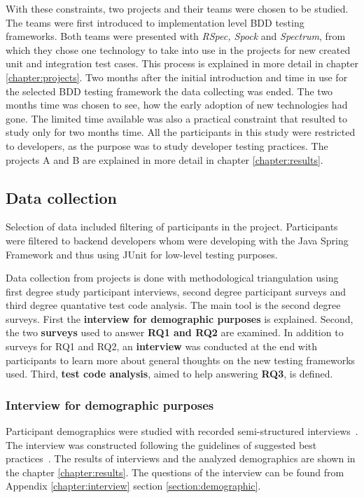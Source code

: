     With these constraints, two projects and their teams were chosen to be studied. The teams were first introduced to
    implementation level BDD testing frameworks. Both teams were presented with \textit{RSpec, Spock} and \textit{Spectrum}, from
    which they chose one technology to take into use in the projects for new created unit and integration test cases. This
    process is explained in more detail in chapter \ref{chapter:projects}. Two months after the initial introduction and time in use for
    the selected BDD testing framework the data collecting was ended. The two months time was chosen to see, how the early
    adoption of new technologies had gone.
    The limited time available was also a practical constraint that resulted to study only for two months time. All the participants
    in this study were restricted to developers, as the purpose was to study developer testing practices. The projects
    A and B are explained in more detail in chapter \ref{chapter:results}.

\subsection{Data collection}
    Selection of data included filtering of participants in the project. Participants were filtered to backend developers
    whom were developing with the Java Spring Framework and thus using JUnit for low-level testing purposes.

    Data collection from projects is done with methodological triangulation using first degree study participant interviews, second degree
    participant surveys and third degree quantative test code analysis. The main tool is the second degree surveys.
    First the \textbf{interview for demographic purposes} is explained. Second, the two \textbf{surveys} used to answer
    \textbf{RQ1 and RQ2} are examined. In addition to surveys for RQ1 and RQ2, an \textbf{interview} was conducted at the end with participants to
    learn more about general thoughts on the new testing frameworks used.
    Third, \textbf{test code analysis}, aimed to help answering \textbf{RQ3}, is defined.

    \subsubsection{Interview for demographic purposes}
    Participant demographics were studied with recorded semi-structured interviews~\cite{cohen2006qualitative}.
    The interview was constructed following the guidelines of suggested best practices~\cite{kitchenham2002preliminary}.
    The results of interviews and the analyzed demographics are shown in the chapter
    \ref{chapter:results}. The questions of the interview can be found from Appendix \ref{chapter:interview} section
    \ref{section:demographic}.

